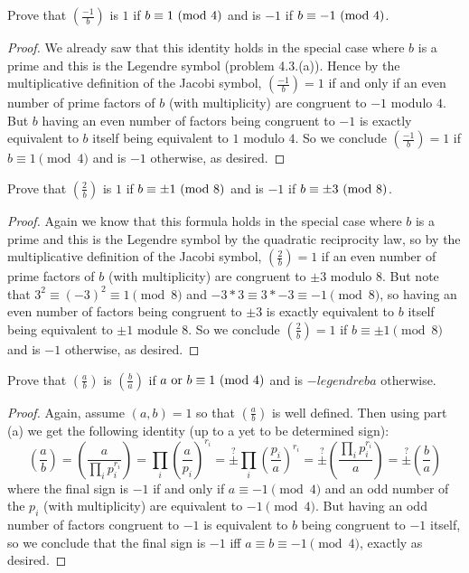 \documentclass[11pt]{article}
\newcommand{\legendre}[2]{\genfrac{(}{)}{}{}{#1}{#2}}
\begin{document}
Prove that $\legendre{-1}{b}$ is $1$ if $b \equiv 1\ (\text{mod}\ 4)$ and is $-1$ if $b \equiv -1\ (\text{mod}\ 4)$.
\begin{proof}
  We already saw that this identity holds in the special case where $b$ is a prime and this is the Legendre symbol (problem 4.3.(a)).
  Hence by the multiplicative definition of the Jacobi symbol, $\legendre{-1}{b} = 1$ if and only if an even number of prime factors of $b$ (with multiplicity) are congruent to $-1$ modulo $4$.
  But $b$ having an even number of factors being congruent to $-1$ is exactly equivalent to $b$ itself being equivalent to $1$ modulo $4$.
  So we conclude $\legendre{-1}{b} = 1$ if $b \equiv 1 \pmod 4$ and is $-1$ otherwise, as desired.
\end{proof}

Prove that $\legendre{2}{b}$ is $1$ if $b \equiv \pm 1\ (\text{mod}\ 8)$ and is $-1$ if $b \equiv \pm 3\ (\text{mod}\ 8)$.
\begin{proof}
  Again we know that this formula holds in the special case where $b$ is a prime and this is the Legendre symbol by the quadratic reciprocity law, so by the multiplicative definition of the Jacobi symbol, $\legendre{2}{b} = 1$ if an even number of prime factors of $b$ (with multiplicity) are congruent to $\pm 3$ modulo $8$.
  But note that $3^2 \equiv (-3)^2 \equiv 1 \pmod 8$ and $-3 * 3 \equiv 3 * -3 \equiv -1 \pmod 8$, so having an even number of factors being congruent to $\pm 3$ is exactly equivalent to $b$ itself being equivalent to $\pm 1$ module $8$.
  So we conclude $\legendre{2}{b} = 1$ if $b \equiv \pm 1 \pmod 8$ and is $-1$ otherwise, as desired.
\end{proof}

Prove that $\legendre{a}{b}$ is $\legendre{b}{a}$ if $a \text{ or } b \equiv 1\ (\text{mod}\ 4)$ and is $-legendre{b}{a}$ otherwise.
\begin{proof}
  Again, assume $(a,b) = 1$ so that $\legendre{a}{b}$ is well defined. Then using part (a) we get the following identity (up to a yet to be determined sign):
  \begin{equation*}
    \legendre{a}{b} = \legendre{a}{\prod_i p_i^{r_i}}
    = \prod_i \legendre{a}{p_i}^{r_i}
    = \stackrel{?}{\pm} \prod_i \legendre{p_i}{a}^{r_i}
    = \stackrel{?}{\pm} \legendre{\prod_i p_i^{r_i}}{a}
    = \stackrel{?}{\pm} \legendre{b}{a}
  \end{equation*}
  where the final sign is $-1$ if and only if $a \equiv -1 \pmod 4$ and an odd number of the $p_i$ (with multiplicity) are equivalent to $-1 \pmod 4$.
  But having an odd number of factors congruent to $-1$ is equivalent to $b$ being congruent to $-1$ itself, so we conclude that the final sign is $-1$ iff $a \equiv b \equiv -1 \pmod 4$, exactly as desired. 
\end{proof}
\end{document}
